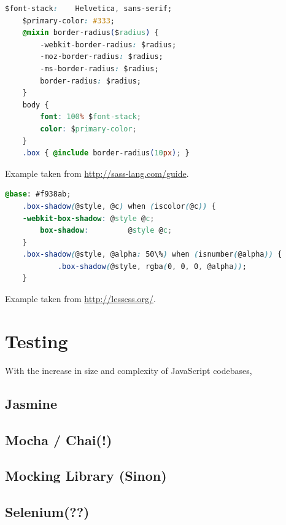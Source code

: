 	\begin{lstlisting}[caption={SCSS example demonstrating the use of variables and mixings}, label={fig:scss_preproc}, language=CSS]
	$font-stack:    Helvetica, sans-serif;
	$primary-color: #333;
	@mixin border-radius($radius) {
		-webkit-border-radius: $radius;
		-moz-border-radius: $radius;
		-ms-border-radius: $radius;
		border-radius: $radius;
	}
	body {
		font: 100% $font-stack;
		color: $primary-color;
	}	
	.box { @include border-radius(10px); }
	\end{lstlisting}
	\small
	Example taken from \url{http://sass-lang.com/guide}.
	
	
	\begin{lstlisting}[caption={LESS example demonstrating the use of variables and default parameters}, label={fig:less_preproc}, language=CSS]
	@base: #f938ab;	
	.box-shadow(@style, @c) when (iscolor(@c)) {
	-webkit-box-shadow: @style @c;
		box-shadow:         @style @c;
	}
	.box-shadow(@style, @alpha: 50\%) when (isnumber(@alpha)) {
			.box-shadow(@style, rgba(0, 0, 0, @alpha));
	}
	\end{lstlisting}
	\small
	Example taken from \url{http://lesscss.org/}.	
	
	
\section{Testing}
\label{sect:testing}

	With the increase in size and complexity of JavaScript codebases,

	\subsection{Jasmine}
	\label{ssect:jasmine}
	
	\subsection{Mocha / Chai(!)}
	\label{ssect:mocha_chai}
	
	\subsection{Mocking Library (Sinon)}
	\label{ssect:mocking}

	\subsection{Selenium(??)}
	\label{ssect:selenium}
	

